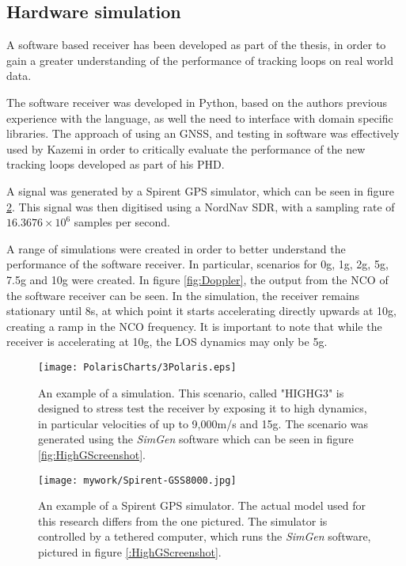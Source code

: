 \subsection{Hardware simulation}
A software based receiver has been developed as part of the thesis, in order to gain a greater understanding of the performance of tracking loops on real world data. 

The software receiver was developed in Python, based on the authors previous experience with the language, as well the need to interface with domain specific libraries. 
The approach of using an \ac{GNSS}, and testing in software was effectively used by Kazemi \cite{KazemiPHD} in order to critically evaluate the performance of the new tracking loops developed as part of his PHD.

A signal was generated by a Spirent \ac{GPS} simulator, which can be seen in figure \ref{fig:Spirent}. This signal was then digitised using a NordNav \ac{SDR}, with a sampling rate of $16.3676 \times 10^6$ samples per second. 

A range of simulations were created in order to better understand the performance of the software receiver. In particular, scenarios for 0g, 1g, 2g, 5g, 7.5g and 10g were created. In figure \ref{fig:Doppler}, the output from the \ac{NCO} of the software receiver can be seen. In the simulation, the receiver remains stationary until 8s, at which point it starts accelerating directly upwards at 10g, creating a ramp in the \ac{NCO} frequency. It is important to note that while the receiver is accelerating at 10g, the \ac{LOS} dynamics may only be 5g. 

\begin{figure}[!htb] 
    \centering
    \texttt{[image: PolarisCharts/3Polaris.eps]} 
    \caption{An example of a simulation. This scenario, called  "HIGHG3" is designed to stress test the receiver by exposing it to high dynamics, in particular velocities of up to 9,000m/s and 15g. The scenario was generated using the \emph{SimGen} software which can be seen in figure \ref{fig:HighGScreenshot}.}
    \label{fig:Polaris3}
\end{figure}


\begin{figure}[!htb] 
    \centering
    \texttt{[image: mywork/Spirent-GSS8000.jpg]} 
    \caption{An example of a Spirent \ac{GPS} simulator. The actual model used for this research differs from the one pictured. The simulator is controlled by a tethered computer, which runs the \emph{SimGen} software, pictured in figure \ref{:HighGScreenshot}.}
    \label{fig:Spirent}
\end{figure}

